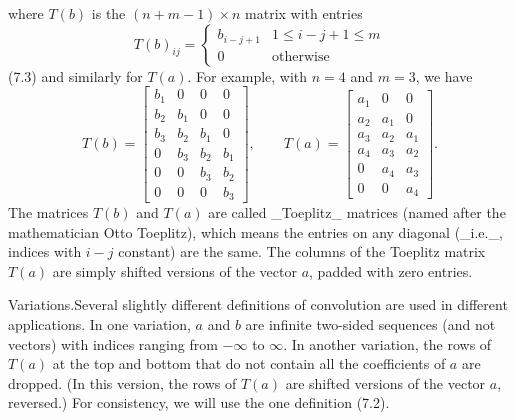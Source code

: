 where \(T(b)\) is the \((n+m-1)\times n\) matrix with entries \[T(b)_{ij}=\left\{\begin{array}{ll}b_{i-j+1}&1\leq i-j+1\leq m\\ 0&\text{otherwise}\end{array}\right.\] (7.3) and similarly for \(T(a)\). For example, with \(n=4\) and \(m=3\), we have \[T(b)=\left[\begin{array}{cccc}b_{1}&0&0&0\\ b_{2}&b_{1}&0&0\\ b_{3}&b_{2}&b_{1}&0\\ 0&b_{3}&b_{2}&b_{1}\\ 0&0&b_{3}&b_{2}\\ 0&0&0&b_{3}\end{array}\right],\qquad T(a)=\left[\begin{array}{cccc}a_{1}&0&0 \\ a_{2}&a_{1}&0\\ a_{3}&a_{2}&a_{1}\\ a_{4}&a_{3}&a_{2}\\ 0&a_{4}&a_{3}\\ 0&0&a_{4}\end{array}\right].\] The matrices \(T(b)\) and \(T(a)\) are called _Toeplitz_ matrices (named after the mathematician Otto Toeplitz), which means the entries on any diagonal (_i.e._, indices with \(i-j\) constant) are the same. The columns of the Toeplitz matrix \(T(a)\) are simply shifted versions of the vector \(a\), padded with zero entries.

Variations.Several slightly different definitions of convolution are used in different applications. In one variation, \(a\) and \(b\) are infinite two-sided sequences (and not vectors) with indices ranging from \(-\infty\) to \(\infty\). In another variation, the rows of \(T(a)\) at the top and bottom that do not contain all the coefficients of \(a\) are dropped. (In this version, the rows of \(T(a)\) are shifted versions of the vector \(a\), reversed.) For consistency, we will use the one definition (7.2).

